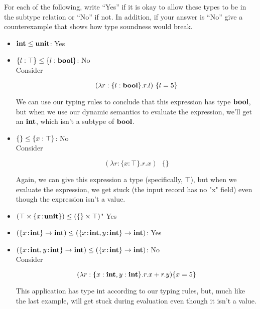 \documentclass[10pt]{article}
\begin{document}
\begin{exercise}
  For each of the following, write ``Yes'' if it is okay to allow
  these types to be in the subtype relation or ``No'' if not. In
  addition, if your answer is ``No'' give a counterexample that shows
  how type soundness would break.

\begin{itemize}
\item $\mathsf{\textbf{int}} \leq \mathsf{\textbf{unit}}$: 
			Yes \\
\item $\{ l : \top \} \leq \{ l : \mathsf{\textbf{bool}} \}$: 
			No \\
			Consider 
			
			$$(\lambda r:\{l:\mathsf{\textbf{bool}}\}.r.l) \text{ } \{l = 5\}$$ 
			
			We can use our typing rules to conclude that this
			expression has type $\mathsf{\textbf{bool}}$, but when we use our dynamic semantics to 
			evaluate the expression, we'll get an $\mathsf{\textbf{int}}$, which isn't a subtype of 
			$\mathsf{\textbf{bool}}$.\\ 

\item $\{ \} \leq \{ x : \top \}$: 
			No \\
			Consider 
			
			$$(\lambda r:\{x:\top\}.r.x) \text{ } \{\}$$ 
			
			Again, we can give this expression a type (specifically, $\top$), but 
			when we evaluate the expression, we get stuck (the input record has no "x"
			field) even though the expression isn't a value.\\
			
\item $(\top \times \{ x \!:\! \mathsf{\textbf{unit}} \}) \leq (\{\} \times \top)$"
			Yes \\
			
			
\item $(\{ x \!:\! \mathsf{\textbf{int}} \} \rightarrow \mathsf{\textbf{int}}) \leq (\{ x \!:\! \mathsf{\textbf{int}}, y \!:\! 			\mathsf{\textbf{int}} \} \rightarrow \mathsf{\textbf{int}})$: 
			Yes \\
			
\item $(\{ x \!:\! \mathsf{\textbf{int}}, y \!:\! \mathsf{\textbf{int}} \} \rightarrow \mathsf{\textbf{int}}) \leq (\{ x \!:\! 
			\mathsf{\textbf{int}} \} \rightarrow \mathsf{\textbf{int}})$:
			No\\
			Consider 
			
			$$(\lambda r:\{x:\mathsf{\textbf{int}}, y:\mathsf{\textbf{int}}\}.r.x + r.y) \{x=5\}$$
			
			This application has type int according to our typing rules, but, much like
			the last example, will get stuck during evaluation even though it isn't a
			value.
			
\end{itemize}
\end{exercise}
\end{document}

